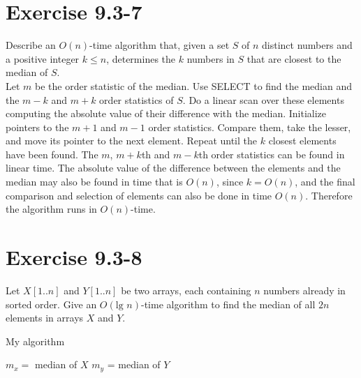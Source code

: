 \documentclass[10pt,a4paper]{article}
\begin{document}
\section*{Exercise 9.3-7}
Describe an $O(n)$-time algorithm that, given a set $S$ of $n$ distinct numbers and a positive integer $k\leq n$, determines the $k$ numbers in $S$ that are closest to the median of $S$.
\vspace*{\baselineskip}
\\
Let $m$ be the order statistic of the median. Use SELECT to find the median and the $m-k$ and $m+k$ order statistics of $S$. Do a linear scan over these elements computing the absolute value of their difference with the median. Initialize pointers to the $m+1$ and $m-1$ order statistics. Compare them, take the lesser, and move its pointer to the next element. Repeat until the $k$ closest elements have been found. The $m$, $m+k$th and $m-k$th order statistics can be found in linear time. The absolute value of the difference between the elements and the median may also be found in time that is $O(n)$, since $k=O(n)$, and the final comparison and selection of elements can also be done in time $O(n)$. Therefore the algorithm runs in $O(n)$-time.

\section*{Exercise 9.3-8}
Let $X[1..n]$ and $Y[1..n]$ be two arrays, each containing $n$ numbers already in sorted order. Give an $O(\text{lg }n)$-time algorithm to find the median of all $2n$ elements in arrays $X$ and $Y$.
\vspace*{\baselineskip}
\\
\begin{algorithm}
\caption{My algorithm}\label{word}
\begin{algorithmic}
	\State $m_x=$ median of $X$
	\State $m_y$ = median of $Y$
		\Else
		\EndIf
	\EndIf
\EndFunction
\end{algorithmic}
\end{algorithm}
\end{document}
